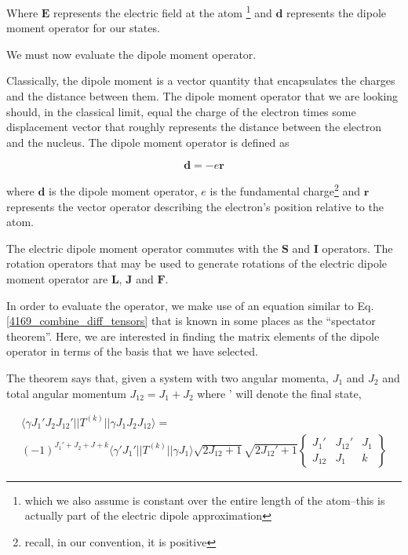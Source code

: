 Where $\mathbf{E}$ represents the electric field at the atom \footnote{which we also assume is constant over the entire length of the atom--this is actually part of the electric dipole approximation} and $\mathbf{d}$ represents the dipole moment operator for our states. 

We must now evaluate the dipole moment operator. 


Classically, the dipole moment is a vector quantity that encapsulates the charges and the distance between them. The dipole moment operator that we are looking should, in the classical limit, equal the charge of the electron times some displacement vector that roughly represents the distance between the electron and the nucleus. The dipole moment operator is defined as 

\begin{equation}
\mathbf{d}=-e\mathbf{r}
\end{equation}

where $\mathbf{d}$ is the dipole moment operator, $e$ is the fundamental charge\footnote{recall, in our convention, it is positive} and $\mathbf{r}$ represents the vector operator describing the electron's position relative to the atom\cite{demilleBudkerKimball}.

The electric dipole moment operator commutes with the $\mathbf{S}$ and $\mathbf{I}$ operators. The rotation operators that may be used to generate rotations of the electric dipole moment operator are $\mathbf{L}$, $\mathbf{J}$ and $\mathbf{F}$.\cite{DeMille_presentation}

In order to evaluate the operator, we make use of an equation similar to Eq.\,\ref{4169_combine_diff_tensors} that is known in some places as the ``spectator theorem''\cite{DeMille_presentation}. Here, we are interested in finding the matrix elements of the dipole operator in terms of the  basis that we have selected.

The theorem says that, given a system with two angular momenta, $J_1$ and $J_2$ and total angular momentum $J_{12}=J_1+J_2$ where ' will denote the final state, 

\begin{multline}\label{spectatorTheorem}
\langle\gamma J_1'J_2J_{12}'||T^{(k)}||\gamma J_1 J_2 J_{12}\rangle=
\\(-1)^{J_1'+J_2+J+k}\langle\gamma'J_1'||T^{(k)}||\gamma J_1\rangle
\sqrt{2J_{12}+1}\sqrt{2J_{12}'+1}
\begin{Bmatrix}
J_1' & J_{12}' & J_1 \\
J_{12} & J_1 & k
\end{Bmatrix}
\end{multline}

